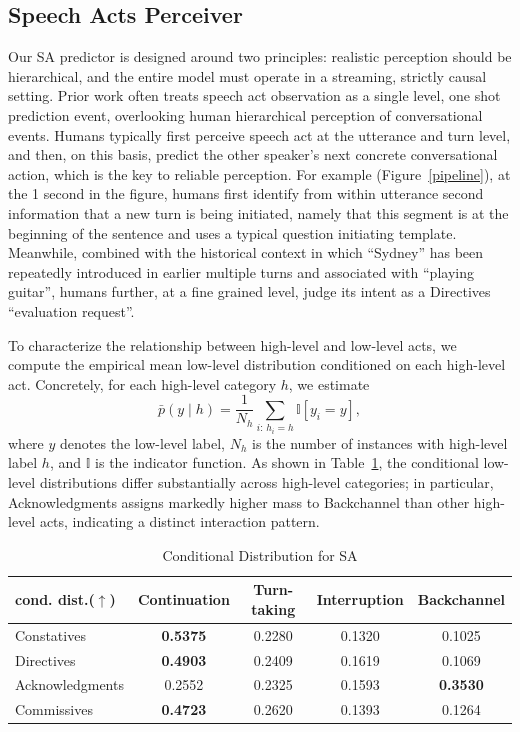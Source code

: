 \subsection{Speech Acts Perceiver}
Our SA predictor is designed around two principles: realistic perception should be hierarchical, and the entire model must operate in a streaming, strictly causal setting. Prior work often treats speech act observation as a single level, one shot prediction event, overlooking human hierarchical perception of conversational events. Humans typically first perceive speech act at the utterance and turn level, and then, on this basis, predict the other speaker’s next concrete conversational action, which is the key to reliable perception. For example (Figure~\ref{pipeline}), at the 1 second in the figure, humans first identify from within utterance second information that a new turn is being initiated, namely that this segment is at the beginning of the sentence and uses a typical question initiating template. Meanwhile, combined with the historical context in which “Sydney” has been repeatedly introduced in earlier multiple turns and associated with “playing guitar”, humans further, at a fine grained level, judge its intent as a Directives “evaluation request”.

To characterize the relationship between high-level and low-level acts, we compute the empirical mean low-level distribution conditioned on each high-level act. Concretely, for each high-level category $h$, we estimate \begin{equation} \bar{p}(y \mid h)=\frac{1}{N_h}\sum_{i:\,h_i=h}\mathbb{I}[y_i=y], \end{equation} where $y$ denotes the low-level label, $N_h$ is the number of instances with high-level label $h$, and $\mathbb{I}$ is the indicator function. As shown in Table~\ref{tab:JSD_for_SA}, the conditional low-level distributions differ substantially across high-level categories; in particular, Acknowledgments assigns markedly higher mass to Backchannel than other high-level acts, indicating a distinct interaction pattern.
\begin{table}[t]
\centering
\caption{Conditional Distribution for SA}
\label{tab:JSD_for_SA}

{\fontsize{7.5}{9.5}\selectfont
\renewcommand{\arraystretch}{0.92} 
\setlength{\tabcolsep}{3pt}     

\begin{tabular}{@{}l|cccc@{}}
\toprule
cond. dist.($\uparrow$) & Continuation & Turn-taking & Interruption & Backchannel \\
\midrule
Constatives      & \textbf{0.5375} & 0.2280 & 0.1320 & 0.1025 \\
Directives       & \textbf{0.4903} & 0.2409 & 0.1619 & 0.1069 \\
Acknowledgments  & 0.2552 & 0.2325 & 0.1593 & \textbf{0.3530} \\
Commissives      & \textbf{0.4723} & 0.2620 & 0.1393 & 0.1264 \\
\bottomrule
\end{tabular}
}
\end{table}


